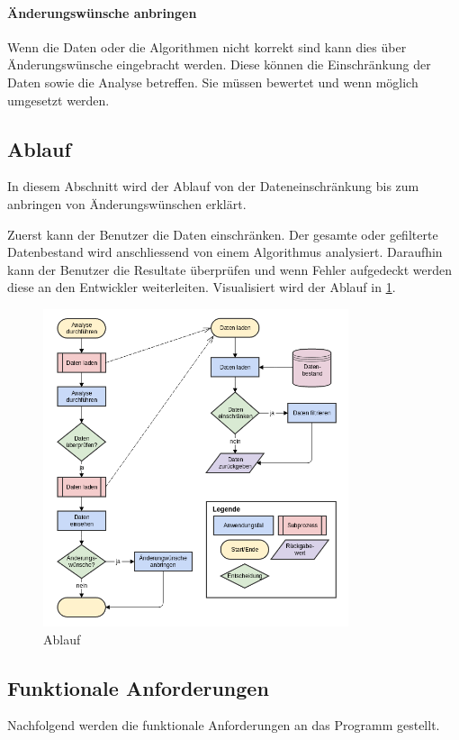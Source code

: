 \paragraph{Änderungswünsche anbringen} Wenn die Daten oder die Algorithmen nicht korrekt sind kann dies über Änderungswünsche eingebracht werden. Diese können die Einschränkung der Daten sowie die Analyse betreffen. Sie müssen bewertet und wenn möglich umgesetzt werden.

\subsection{Ablauf}
\label{sec:anforderungsanalyse:ablauf}
In diesem Abschnitt wird der Ablauf von der Dateneinschränkung bis zum anbringen von Änderungswünschen erklärt.

Zuerst kann der Benutzer die Daten einschränken. Der gesamte oder gefilterte Datenbestand wird anschliessend von einem Algorithmus analysiert. Daraufhin kann der Benutzer die Resultate überprüfen und wenn Fehler aufgedeckt werden diese an den Entwickler weiterleiten.
Visualisiert wird der Ablauf in \cref{fig:anfoderungsanalyse:ablauf:1}.

\begin{figure}[H]
	\RawFloats
	\centering
	\includegraphics[width=0.8\textwidth]{images/flowchart}
	\caption{Ablauf}
	\label{fig:anfoderungsanalyse:ablauf:1}
\end{figure}

\subsection{Funktionale Anforderungen}
\label{sec:anforderungsanalyse:funktionaleanforderung}
Nachfolgend werden die funktionale Anforderungen an das Programm gestellt.

